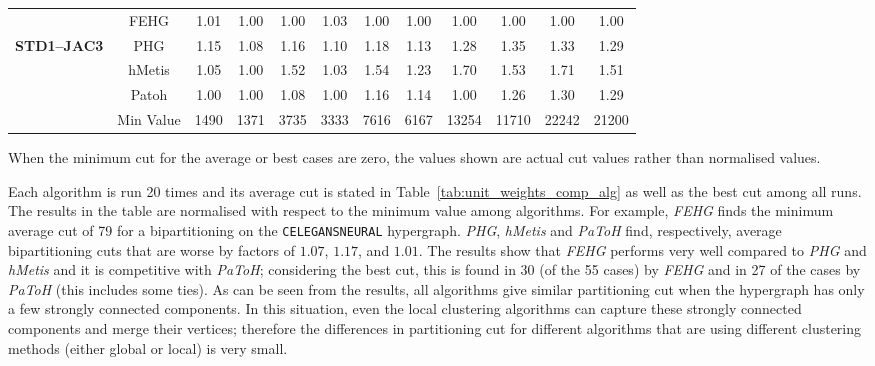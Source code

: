 \documentclass[twocolumn]{svjour3}          \smartqed
\begin{document}
\begin{table*}[hp]
{\begin{threeparttable}
\begin{tabular}{|l|c|cc|cc|cc|cc|cc|}
& FEHG			& 1.01	& 1.00	& 1.00	& 1.03	& 1.00	& 1.00	& 1.00	& 1.00	& 1.00	& 1.00 \\
\textbf{ STD1--JAC3}
			& PHG			& 1.15	& 1.08	& 1.16	& 1.10	& 1.18	& 1.13	& 1.28	& 1.35	& 1.33	& 1.29 \\
			& hMetis			& 1.05	& 1.00	& 1.52	& 1.03	& 1.54	& 1.23	& 1.70	& 1.53	& 1.71	& 1.51 \\
			& Patoh			& 1.00	& 1.00	& 1.08	& 1.00	& 1.16	& 1.14	& 1.00	& 1.26	& 1.30	& 1.29 \\
			\cline{2-12}
			& Min Value		& 1490	& 1371	& 3735	& 3333	& 7616	& 6167	& 13254	& 11710	& 22242 & 21200\\

			\hline
		\end{tabular}
		\begin{tablenotes}
			\item[\textasteriskcentered] When the minimum cut for the average or best cases are zero, the values
			 shown are actual cut values rather than normalised values. 
		\end{tablenotes}
	\end{threeparttable}
	}	\end{table*}




Each algorithm is run 20 times and its average cut is stated in Table~\ref{tab:unit_weights_comp_alg} as well as the best cut among all runs. The results in the table are normalised with respect to the minimum value among algorithms. For example, \textit{FEHG} finds the minimum average cut of 79 for a bipartitioning on the \texttt{CELEGANSNEURAL} hypergraph. \textit{PHG}, \textit{hMetis} and \textit{PaToH}  find, respectively, average bipartitioning cuts that are worse by factors of $1.07$, $1.17$, and $1.01$.  The results show that \textit{FEHG} performs very well compared to \textit{PHG} and \textit{hMetis} and it is competitive with \textit{PaToH}; considering the best cut, this is found in 30 (of the 55 cases) by \textit{FEHG} and in 27 of the cases by \textit{PaToH} (this includes some ties). As can be seen from the results, all algorithms give similar partitioning cut when the hypergraph has only a few strongly connected components. In this situation, even the local clustering algorithms can capture these strongly connected components and merge their vertices; therefore the differences in partitioning cut for different algorithms that are using different clustering methods (either global or local) is very small.
\end{document}
